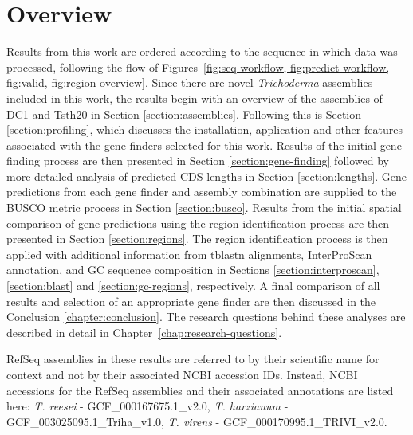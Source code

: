 \section{Overview}

Results from this work are ordered according to the sequence in which
data was processed, following the flow of
Figures~\ref{fig:seq-workflow, fig:predict-workflow, fig:valid,
  fig:region-overview}. Since there are novel \textit{Trichoderma}
assemblies included in this work, the results begin with an overview
of the assemblies of DC1 and Tsth20 in Section
\ref{section:assemblies}. Following this is Section
\ref{section:profiling}, which discusses the installation, application
and other features associated with the gene finders selected for this
work. Results of the initial gene finding process are then presented
in Section \ref{section:gene-finding} followed by more detailed
analysis of predicted CDS lengths in Section
\ref{section:lengths}. Gene predictions from each gene finder and
assembly combination are supplied to the BUSCO metric process in
Section \ref{section:busco}. Results from the initial spatial
comparison of gene predictions using the region identification process
are then presented in Section \ref{section:regions}. The region
identification process is then applied with additional information
from tblastn alignments, InterProScan annotation, and GC sequence
composition in Sections \ref{section:interproscan},
\ref{section:blast} and \ref{section:gc-regions}, respectively. A
final comparison of all results and selection of an appropriate gene
finder are then discussed in the Conclusion
\ref{chapter:conclusion}. The research questions behind these analyses
are described in detail in Chapter~\ref{chap:research-questions}.

RefSeq assemblies in these results are referred to by their scientific
name for context and not by their associated NCBI accession
IDs. Instead, NCBI accessions for the RefSeq assemblies and their
associated annotations are listed here: \textit{T. reesei} -
GCF\_000167675.1\_v2.0, \textit{T. harzianum} -
GCF\_003025095.1\_Triha\_v1.0, \textit{T. virens} - GCF\_000170995.1\_TRIVI\_v2.0.
